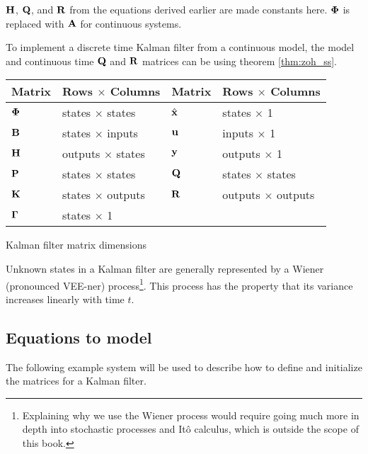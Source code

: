 $\mathbf{H}$, $\mathbf{Q}$, and $\mathbf{R}$ from the equations derived earlier are made
constants here. $\mathbf{\Phi}$ is replaced with $\mathbf{A}$ for continuous systems.

\begin{remark}
  To implement a discrete time Kalman filter from a continuous model, the model
  and continuous time $\mathbf{Q}$ and $\mathbf{R}$ matrices can be
   using theorem \ref{thm:zoh_ss}.
\end{remark}

\begin{booktable}
  \begin{tabular}{|ll|ll|}
    \hline
    \rowcolor{headingbg}
    \textbf{Matrix} & \textbf{Rows $\times$ Columns} &
    \textbf{Matrix} & \textbf{Rows $\times$ Columns} \\
    \hline
    $\mathbf{\Phi}$ & states $\times$ states & $\hat{\mathbf{x}}$ & states $\times$ 1
      \\
    $\mathbf{B}$ & states $\times$ inputs & $\mathbf{u}$ & inputs $\times$ 1 \\
    $\mathbf{H}$ & outputs $\times$ states & $\mathbf{y}$ & outputs $\times$ 1 \\
    $\mathbf{P}$ & states $\times$ states & $\mathbf{Q}$ & states $\times$ states \\
    $\mathbf{K}$ & states $\times$ outputs & $\mathbf{R}$ & outputs $\times$ outputs
      \\
    $\mathbf{\Gamma}$ & states $\times$ 1 &  &  \\
    \hline
  \end{tabular}
  \caption{Kalman filter matrix dimensions}
  \label{tab:kf_matrix_dims}
\end{booktable}

Unknown \glspl{state} in a Kalman filter are generally represented by a Wiener
(pronounced VEE-ner) process\footnote{Explaining why we use the Wiener process
would require going much more in depth into stochastic processes and It\^{o}
calculus, which is outside the scope of this book.}. This process has the
property that its variance increases linearly with time $t$.

\subsection{Equations to model}

The following example \gls{system} will be used to describe how to define and
initialize the matrices for a Kalman filter.

